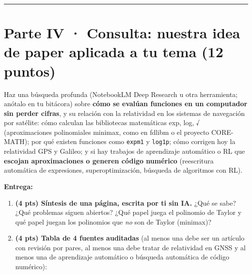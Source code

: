 \begin{center}\rule{0.5\linewidth}{0.5pt}\end{center}

\section{Parte IV · Consulta: nuestra idea de paper aplicada a tu tema (12 puntos)}

Haz una búsqueda profunda (NotebookLM Deep Research u otra herramienta; anótalo en tu bitácora) sobre \textbf{cómo se evalúan funciones en un computador sin perder cifras}, y su relación con la relatividad en los sistemas de navegación por satélite: cómo calculan las bibliotecas matemáticas exp, log, √ (aproximaciones polinomiales minimax, como en fdlibm o el proyecto CORE-MATH); por qué existen funciones como \texttt{expm1} y \texttt{log1p}; cómo corrigen hoy la relatividad GPS y Galileo; y si hay trabajos de aprendizaje automático o RL que \textbf{escojan aproximaciones o generen código numérico} (reescritura automática de expresiones, superoptimización, búsqueda de algoritmos con RL).

\textbf{Entrega:}

\begin{enumerate}
\def\labelenumi{\arabic{enumi}.}
\item
  \textbf{(4 pts) Síntesis de una página, escrita por ti sin IA.} ¿Qué se sabe? ¿Qué problemas siguen abiertos? ¿Qué papel juega el polinomio de Taylor y qué papel juegan los polinomios que \emph{no} son de Taylor (minimax)?
\item
  \textbf{(4 pts) Tabla de 4 fuentes auditadas} (al menos una debe ser un artículo con revisión por pares, al menos una debe tratar de relatividad en GNSS y al menos una de aprendizaje automático o búsqueda automática de código numérico):
\end{enumerate}

